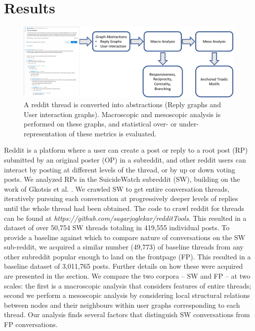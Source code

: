 \vspace{-5mm}
\section{Results}
\begin{figure}[!ht]
    \centering
    \includegraphics[width=0.7\linewidth]{Figures/Pipeline.pdf}
    \caption{A reddit thread is converted into abstractions (Reply graphs and User interaction graphs). Macroscopic and mesoscopic analysis is performed on these graphs, and statistical over- or under- representation of these metrics is evaluated.}
    \label{fig:pipeline}
\end{figure}

Reddit is a platform where a user can create a post or reply to a root post (RP) submitted by an original poster (OP) in a subreddit, and other reddit users can interact by posting at different levels of the thread, or by up or down voting posts. We analyzed RPs in the SuicideWatch subreddit (SW), building on the work of Gkotsis et al. \cite{gkotsis2017characterisation}.
We crawled SW to get entire conversation threads,
iteratively pursuing each conversation at progressively deeper levels of replies until the whole thread had been obtained. The code to crawl reddit for threads can be found at \textit{https://github.com/sagarjoglekar/redditTools}. This resulted in a dataset of over 50,754 SW threads totaling in 419,555 individual posts. 
To provide a baseline against which to compare nature of conversations on the SW sub-reddit, we acquired a similar number (49,773) of baseline threads from any other subreddit popular enough to land on the frontpage (FP). This resulted in a baseline dataset of 3,011,765 posts. Further details on how these were acquired are presented in the  section. We compare the two corpora -- SW and FP -- at two scales: the first is a macroscopic analysis that considers features of entire threads; second we perform a mesoscopic analysis by considering local structural relations between nodes and their neighbours within user graphs corresponding to each thread. Our analysis finds several factors that distinguish SW conversations from FP conversations. %

